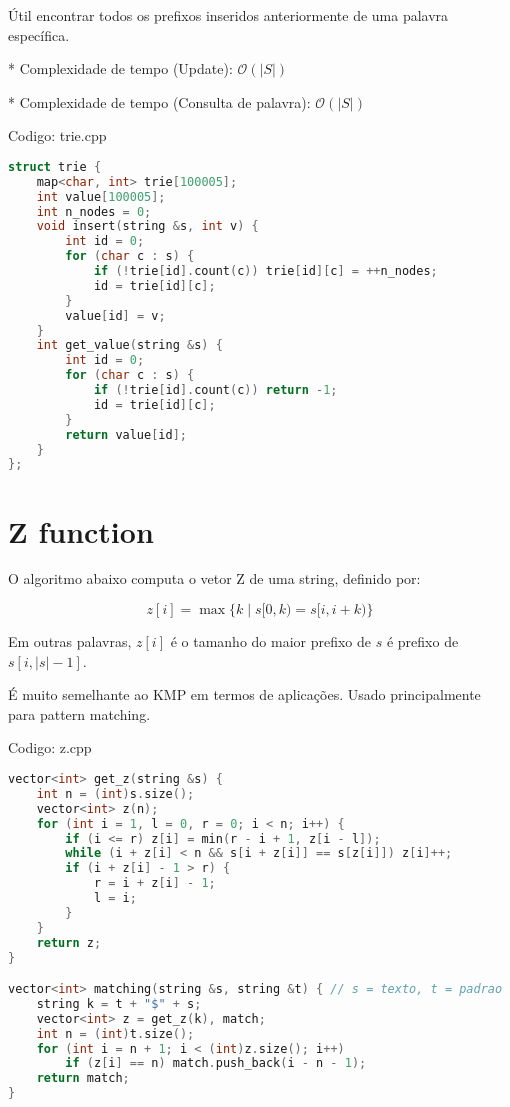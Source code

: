 \documentclass[10pt, a4paper, oneside]{book}
\begin{document}
Útil encontrar todos os prefixos inseridos anteriormente de uma palavra específica.



* Complexidade de tempo (Update): $\mathcal{O}(|S|)$

* Complexidade de tempo (Consulta de palavra): $\mathcal{O}(|S|)$

\hfill

Codigo: trie.cpp

\begin{lstlisting}[language=C++]
struct trie {
    map<char, int> trie[100005];
    int value[100005];
    int n_nodes = 0;
    void insert(string &s, int v) {
        int id = 0;
        for (char c : s) {
            if (!trie[id].count(c)) trie[id][c] = ++n_nodes;
            id = trie[id][c];
        }
        value[id] = v;
    }
    int get_value(string &s) {
        int id = 0;
        for (char c : s) {
            if (!trie[id].count(c)) return -1;
            id = trie[id][c];
        }
        return value[id];
    }
};
\end{lstlisting}
\hfill

\section{Z function}


O algoritmo abaixo computa o vetor Z de uma string, definido por:



$$ z[i] = \max\{k \mid s[0,k) = s[i,i+k)\} $$



Em outras palavras, $z[i]$ é o tamanho do maior prefixo de $s$ é prefixo de $s[i,|s|-1]$.



É muito semelhante ao KMP em termos de aplicações. Usado principalmente para pattern matching.
\hfill

Codigo: z.cpp

\begin{lstlisting}[language=C++]
vector<int> get_z(string &s) {
    int n = (int)s.size();
    vector<int> z(n);
    for (int i = 1, l = 0, r = 0; i < n; i++) {
        if (i <= r) z[i] = min(r - i + 1, z[i - l]);
        while (i + z[i] < n && s[i + z[i]] == s[z[i]]) z[i]++;
        if (i + z[i] - 1 > r) {
            r = i + z[i] - 1;
            l = i;
        }
    }
    return z;
}

vector<int> matching(string &s, string &t) { // s = texto, t = padrao
    string k = t + "$" + s;
    vector<int> z = get_z(k), match;
    int n = (int)t.size();
    for (int i = n + 1; i < (int)z.size(); i++)
        if (z[i] == n) match.push_back(i - n - 1);
    return match;
}\end{lstlisting}
\hfill
\end{document}
